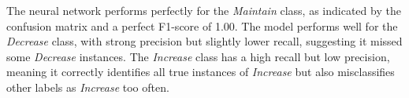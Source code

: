 \documentclass[titlepage]{article}
\begin{document}
The neural network performs perfectly for the \emph{Maintain} class, as indicated by the confusion matrix and a perfect F1-score of 1.00.
The model performs well for the \emph{Decrease} class, with strong precision but slightly lower recall, suggesting it missed some \emph{Decrease} instances.
The \emph{Increase} class has a high recall but low precision, meaning it correctly identifies all true instances of \emph{Increase} but also misclassifies other labels as \emph{Increase} too often.
\end{document}
